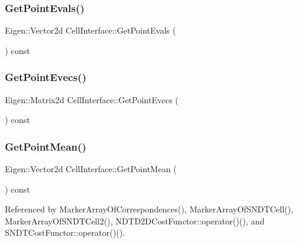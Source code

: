 \subsubsection{\texorpdfstring{Get\+Point\+Evals()}{GetPointEvals()}}
{\footnotesize\ttfamily Eigen\+::\+Vector2d Cell\+Interface\+::\+Get\+Point\+Evals (\begin{DoxyParamCaption}{ }\end{DoxyParamCaption}) const\hspace{0.3cm}{\ttfamily [inline]}}

\mbox{\label{classCellInterface_a727b6d5c67e6628db2edbe00df6d2b05}} 
\subsubsection{\texorpdfstring{Get\+Point\+Evecs()}{GetPointEvecs()}}
{\footnotesize\ttfamily Eigen\+::\+Matrix2d Cell\+Interface\+::\+Get\+Point\+Evecs (\begin{DoxyParamCaption}{ }\end{DoxyParamCaption}) const\hspace{0.3cm}{\ttfamily [inline]}}

\mbox{\label{classCellInterface_a8eecc9d9e5e3d6c327c830f15d0e4bed}} 
\subsubsection{\texorpdfstring{Get\+Point\+Mean()}{GetPointMean()}}
{\footnotesize\ttfamily Eigen\+::\+Vector2d Cell\+Interface\+::\+Get\+Point\+Mean (\begin{DoxyParamCaption}{ }\end{DoxyParamCaption}) const\hspace{0.3cm}{\ttfamily [inline]}}



Referenced by Marker\+Array\+Of\+Correspondences(), Marker\+Array\+Of\+S\+N\+D\+T\+Cell(), Marker\+Array\+Of\+S\+N\+D\+T\+Cell2(), N\+D\+T\+D2\+D\+Cost\+Functor\+::operator()(), and S\+N\+D\+T\+Cost\+Functor\+::operator()().

\mbox{\label{classCellInterface_a011b22b778a1cac212becf05c204c48e}} 
